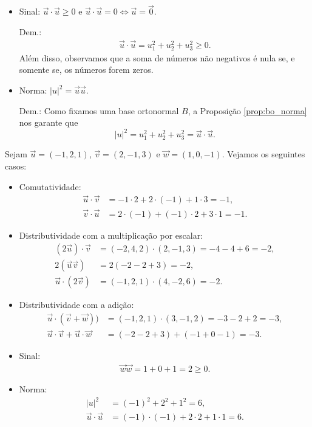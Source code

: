 \begin{itemize}
\item Sinal: $\vec{u}\cdot\vec{u}\geq 0$ e $\vec{u}\cdot\vec{u}=0 \Leftrightarrow \vec{u}=\vec{0}$.

  Dem.:
  \begin{align}
    \vec{u}\cdot\vec{u} = u_1^2+u_2^2+u_3^2 \geq 0.
  \end{align}
  Além disso, observamos que a soma de números não negativos é nula se, e somente se, os números forem zeros.

\item Norma: $|u|^2 = \vec{u}\vec{u}$.

  Dem.:
  Como fixamos uma base ortonormal $B$, a Proposição \ref{prop:bo_norma} nos garante que
  \begin{equation}
    |u|^2 = u_1^2+u_2^2+u_3^2 = \vec{u}\cdot\vec{u}.
  \end{equation}
\end{itemize}

\begin{ex}
  Sejam $\vec{u}=(-1,2,1)$, $\vec{v}=(2,-1,3)$ e $\vec{w}=(1,0,-1)$. Vejamos os seguintes casos:
  \begin{itemize}
  \item Comutatividade:
    \begin{align}
      \vec{u}\cdot\vec{v} &= -1\cdot 2 + 2\cdot (-1) + 1\cdot 3 = -1,\\
      \vec{v}\cdot\vec{u} &= 2\cdot(-1) + (-1)\cdot 2 + 3\cdot 1 = -1.            
    \end{align}
  \item Distributividade com a multiplicação por escalar:
    \begin{align}
      (2\vec{u})\cdot\vec{v} &= (-2,4,2)\cdot(2,-1,3) = -4-4+6=-2,\\
      2(\vec{u}\vec{v}) &= 2(-2-2+3) = -2,\\
      \vec{u}\cdot(2\vec{v}) &= (-1,2,1)\cdot(4,-2,6) = -2.
    \end{align}
  \item Distributividade com a adição:
    \begin{align}
      \vec{u}\cdot(\vec{v}+\vec{w})) &= (-1,2,1)\cdot(3,-1,2) = -3-2+2=-3,\\
      \vec{u}\cdot\vec{v}+\vec{u}\cdot\vec{w} &= (-2-2+3)+(-1+0-1) = -3.
    \end{align}
  \item Sinal:
    \begin{align}
      \vec{w}\vec{w} = 1+0+1 = 2 \geq 0.
    \end{align}
  \item Norma:
    \begin{align}
      |u|^2 &= (-1)^2+2^2+1^2 = 6,\\
      \vec{u}\cdot\vec{u} &= (-1)\cdot(-1)+2\cdot 2+1\cdot 1 = 6.
    \end{align}
  \end{itemize}
\end{ex}


